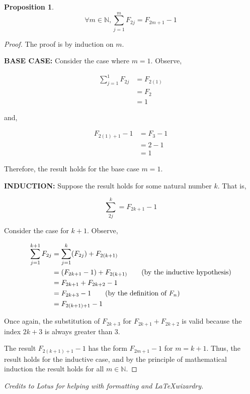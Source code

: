 \documentclass{article} %
\newtheorem{proposition}{Proposition}
\newcommand{\emptyline}{\vspace{\baselineskip}}
\begin{document}
\begin{proposition}
  \[
    \forall m \in \mathbb{N}, \sum_{j=1}^{m} F_{2j} = F_{2m+1} - 1
  \]
\end{proposition}

\begin{proof} The proof is by induction on $m$.

  \emptyline

  \textbf{BASE CASE:} Consider the case where $m=1$. Observe,

  \[\begin{aligned}
    \sum_{j=1}^1 F_{2j} &= F_{2(1)} \\
                        &= F_2 \\
                        &= 1
  \end{aligned}\]

  and,

  \[\begin{aligned}
    F_{2(1)+1}-1 &= F_3 - 1 \\
                 &= 2 - 1 \\
                 &= 1
  \end{aligned}\]

  Therefore, the result holds for the base case $m=1$.

  \emptyline

  \textbf{INDUCTION:} Suppose the result holds for some natural number $k$. That is,

  \[
    \sum_{2j}^{k} = F_{2k+1}-1
  \]

  Consider the case for $k+1$. Observe,

  \begin{align}
    \sum_{j=1}^{k+1}F_{2j} &= \sum_{j=1}^k (F_{2j}) + F_{2(k+1)} \notag \\
                          &= (F_{2k+1} - 1) + F_{2(k+1)} \tag{by the inductive hypothesis} \\
                          &= F_{2k+1} + F_{2k+2} - 1 \notag \\
                          &= F_{2k+3} - 1 \tag{by the definition of $F_n$} \\
                          &= F_{2(k+1)+1} - 1 \notag
  \end{align}

  Once again, the substitution of $F_{2k+3}$ for $F_{2k+1} + F_{2k+2}$ is valid because the index $2k+3$ is always greater than 3.

  The result $F_{2(k+1)+1} - 1$ has the form $F_{2m+1} - 1$ for $m = k+1$. Thus, the result holds for the inductive case, and by the principle of mathematical induction the result holds for all $m \in \mathbb{N}$.

\end{proof}

\textit{Credits to Lotus for helping with formatting and \LaTeX\space wizardry.}
\end{document}
